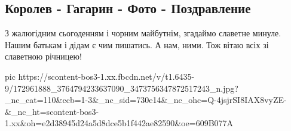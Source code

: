  
 
 
 
 

\subsection{Королев - Гагарин - Фото - Поздравление}
\label{sec:13_04_2021.fb.bernadskij_bogdan.1.foto_korolev_gagarin}

З жалюгідним сьогоденням і чорним майбутнім, згадаймо славетне минуле. Нашим
батькам і дідам є чим пишатись. А нам, ними. Тож вітаю всіх зі славетною
річницею!


\ifcmt
  pic https://scontent-bos3-1.xx.fbcdn.net/v/t1.6435-9/172961888_3764794233637090_3473756347872517243_n.jpg?_nc_cat=110&ccb=1-3&_nc_sid=730e14&_nc_ohc=Q-4jsjrSI8IAX8vyZE-&_nc_ht=scontent-bos3-1.xx&oh=e2d38945d24a5d8dce5b1f442ae82590&oe=609B077A
\fi

